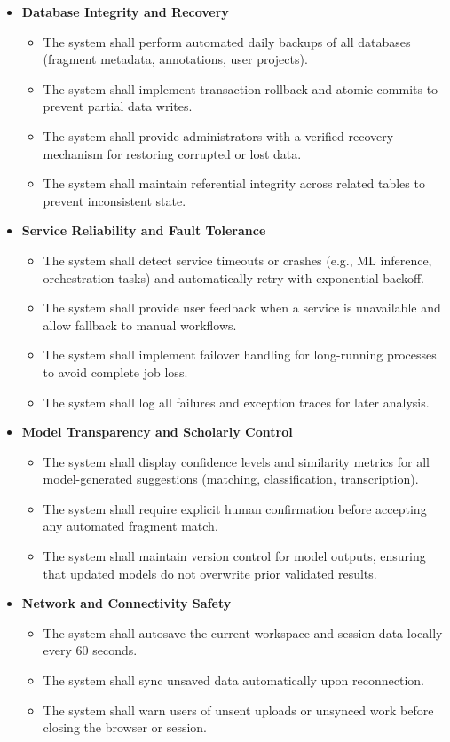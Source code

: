 \documentclass{article}
\begin{document}
\begin{itemize}
    \item \textbf{Database Integrity and Recovery}
    \begin{itemize}
        \item The system shall perform automated daily backups of all databases (fragment metadata, annotations, user projects).
        \item The system shall implement transaction rollback and atomic commits to prevent partial data writes.
        \item The system shall provide administrators with a verified recovery mechanism for restoring corrupted or lost data.
        \item The system shall maintain referential integrity across related tables to prevent inconsistent state.
    \end{itemize}

    \item \textbf{Service Reliability and Fault Tolerance}
    \begin{itemize}
        \item The system shall detect service timeouts or crashes (e.g., ML inference, orchestration tasks) and automatically retry with exponential backoff.
        \item The system shall provide user feedback when a service is unavailable and allow fallback to manual workflows.
        \item The system shall implement failover handling for long-running processes to avoid complete job loss.
        \item The system shall log all failures and exception traces for later analysis.
    \end{itemize}

    \item \textbf{Model Transparency and Scholarly Control}
    \begin{itemize}
        \item The system shall display confidence levels and similarity metrics for all model-generated suggestions (matching, classification, transcription).
        \item The system shall require explicit human confirmation before accepting any automated fragment match.
        \item The system shall maintain version control for model outputs, ensuring that updated models do not overwrite prior validated results.
    \end{itemize}

    \item \textbf{Network and Connectivity Safety}
    \begin{itemize}
        \item The system shall autosave the current workspace and session data locally every 60 seconds.
        \item The system shall sync unsaved data automatically upon reconnection.
        \item The system shall warn users of unsent uploads or unsynced work before closing the browser or session.
    \end{itemize}


\end{itemize}
\end{document}
